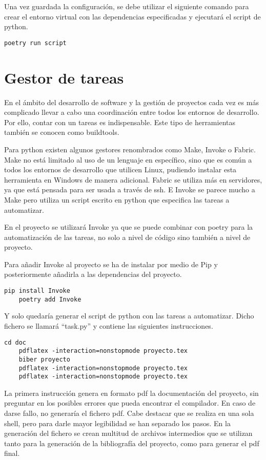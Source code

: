 Una vez guardada la configuración, se debe utilizar el siguiente comando para crear el entorno virtual con las \glspl{dependencia} especificadas y ejecutará el \gls{script} de \gls{python}. 
\begin{lstlisting}[style=consola]
	poetry run script
\end{lstlisting}

\section{Gestor de tareas}
En el ámbito del desarrollo de software y la gestión de proyectos cada vez es más complicado llevar a cabo una coordinación entre todos los entornos de desarrollo. Por ello, contar con un \gls{tareas} es indispensable. Este tipo de herramientas también se conocen como \gls{buildtools}. 

Para \gls{python} existen algunos gestores renombrados como Make, Invoke o Fabric. Make no está limitado al uso de un lenguaje en específico, sino que es común a todos los entornos de desarrollo que utilicen Linux, pudiendo instalar esta herramienta en Windows de manera adicional. Fabric se utiliza más en servidores, ya que está pensada para ser usada a través de \gls{ssh}. E Invoke se parece mucho a Make pero utiliza un \gls{script} escrito en \gls{python} que especifica las tareas a automatizar. 

En el proyecto se utilizará Invoke ya que se puede combinar con \Gls{poetry} para la automatización de las tareas, no solo a nivel de código sino también a nivel de proyecto.

Para añadir Invoke al proyecto se ha de instalar por medio de Pip y posteriormente añadirla a las \glspl{dependencia} del proyecto.
\begin{lstlisting}[style=consola]
	pip install Invoke
	poetry add Invoke
\end{lstlisting}

Y solo quedaría generar el \gls{script} de python con las tareas a automatizar. Dicho fichero se llamará ``task.py'' y contiene las siguientes instrucciones. 

\begin{lstlisting}[style=consola]
	cd doc
	pdflatex -interaction=nonstopmode proyecto.tex
	biber proyecto
	pdflatex -interaction=nonstopmode proyecto.tex
	pdflatex -interaction=nonstopmode proyecto.tex
\end{lstlisting}
La primera instrucción genera en formato pdf la documentación del proyecto, sin preguntar en los posibles errores que pueda encontrar el compilador. En caso de darse fallo, no generaría el fichero pdf. Cabe destacar que se realiza en una sola \gls{shell}, pero para darle mayor legibilidad se han separado los pasos. En la generación del fichero se crean multitud de archivos intermedios que se utilizan tanto para la generación de la bibliografía del proyecto, como para generar el pdf final. 

